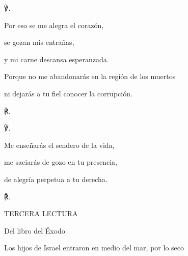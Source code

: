 			\begin{readbody}\begin{readred}℣.\end{readred} Por eso se me alegra el corazón, \end{readbody}
			
			\begin{readtabbed}se gozan mis entrañas, \end{readtabbed}
			
			\begin{readtabbed}y mi carne descansa esperanzada. \end{readtabbed}
			
			\begin{readtabbed}Porque no me abandonarás en la región de los muertos \end{readtabbed}
			
			\begin{readtabbed}ni dejarás a tu fiel conocer la corrupción. \begin{readred}℟.\end{readred}\end{readtabbed}
			
			\begin{readbody}\begin{readred}℣.\end{readred} Me enseñarás el sendero de la vida, \end{readbody}
			
			\begin{readtabbed}me saciarás de gozo en tu presencia, \end{readtabbed}
			
			\begin{readtabbed}de alegría perpetua a tu derecha. \begin{readred}℟.\end{readred}\end{readtabbed}
			
			\begin{readtitle}TERCERA LECTURA\end{readtitle}
			
			\begin{readbook}Del libro del Éxodo \end{readbook}
			
			\begin{readtheme}Los hijos de Israel entraron en medio del mar, por lo seco\end{readtheme}
			
